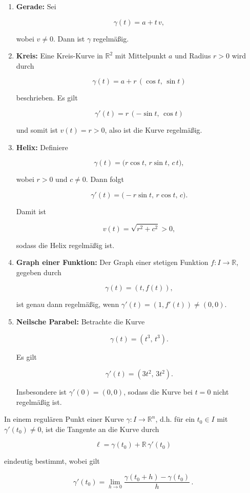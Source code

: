 \begin{beispielbox}
\begin{enumerate}
    \item \textbf{Gerade:} Sei 
    

\[
    \gamma(t) = a + t\,v,
    \]


    wobei $v \neq 0$. Dann ist $\gamma$ regelmäßig.

    \item \textbf{Kreis:} Eine Kreis-Kurve in $\mathbb{R}^2$ mit Mittelpunkt $a$ und Radius $r>0$ wird durch
    

\[
    \gamma(t) = a + r\,(\cos t,\, \sin t)
    \]


    beschrieben. Es gilt
    

\[
    \gamma'(t) = r\,(-\sin t,\, \cos t)
    \]


    und somit ist $v(t)=r>0$, also ist die Kurve regelmäßig.

    \item \textbf{Helix:} Definiere 
    

\[
    \gamma(t) = \bigl( r\cos t,\, r\sin t,\, c\,t \bigr),
    \]


    wobei $r>0$ und $c\neq 0$. Dann folgt
    

\[
    \gamma'(t) = \bigl( -r\sin t,\, r\cos t,\, c \bigr).
    \]


    Damit ist 
    

\[
    v(t)=\sqrt{r^2+c^2}>0,
    \]


    sodass die Helix regelmäßig ist.

    \item \textbf{Graph einer Funktion:} Der Graph einer stetigen Funktion $f : I \to \mathbb{R}$, gegeben durch
    

\[
    \gamma(t) = (t, f(t)),
    \]


    ist genau dann regelmäßig, wenn $\gamma'(t) = (1, f'(t)) \neq (0,0)$.

    \item \textbf{Neilsche Parabel:} Betrachte die Kurve
    

\[
    \gamma(t) = (t^3, \, t^3).
    \]


    Es gilt
    

\[
    \gamma'(t) = (3t^2,\, 3t^2).
    \]


    Insbesondere ist $\gamma'(0)=(0,0)$, sodass die Kurve bei $t=0$ nicht regelmäßig ist.
\end{enumerate}
\end{beispielbox}

\begin{bemerkungbox}
In einem regulären Punkt einer Kurve $\gamma : I \to \mathbb{R}^n$, d.h. für ein $t_0\in I$ mit $\gamma'(t_0)\neq 0$, ist die Tangente an die Kurve durch


\[
\ell = \gamma(t_0) + \mathbb{R}\,\gamma'(t_0)
\]


eindeutig bestimmt, wobei gilt


\[
\gamma'(t_0) = \lim_{h\to 0} \frac{\gamma(t_0+h)-\gamma(t_0)}{h}\,.
\]


\end{bemerkungbox}
